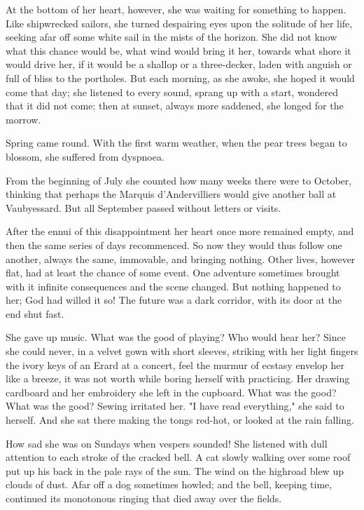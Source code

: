 \documentclass{tufte-book}
\begin{document}
At the bottom of her heart, however, she was waiting for something to
happen. Like shipwrecked sailors, she turned despairing eyes upon the
solitude of her life, seeking afar off some white sail in the mists of
the horizon. She did not know what this chance would be, what wind would
bring it her, towards what shore it would drive her, if it would be a
shallop or a three-decker, laden with anguish or full of bliss to the
portholes. But each morning, as she awoke, she hoped it would come that
day; she listened to every sound, sprang up with a start, wondered that
it did not come; then at sunset, always more saddened, she longed for
the morrow.

Spring came round. With the first warm weather, when the pear trees
began to blossom, she suffered from dyspnoea.

From the beginning of July she counted how many weeks there were to
October, thinking that perhaps the Marquis d'Andervilliers would give
another ball at Vaubyessard. But all September passed without letters or
visits.

After the ennui of this disappointment her heart once more remained
empty, and then the same series of days recommenced. So now they would
thus follow one another, always the same, immovable, and bringing
nothing. Other lives, however flat, had at least the chance of some
event. One adventure sometimes brought with it infinite consequences and
the scene changed. But nothing happened to her; God had willed it so!
The future was a dark corridor, with its door at the end shut fast.

She gave up music. What was the good of playing? Who would hear her?
Since she could never, in a velvet gown with short sleeves, striking
with her light fingers the ivory keys of an Erard at a concert, feel
the murmur of ecstasy envelop her like a breeze, it was not worth while
boring herself with practicing. Her drawing cardboard and her embroidery
she left in the cupboard. What was the good? What was the good? Sewing
irritated her. "I have read everything," she said to herself. And she
sat there making the tongs red-hot, or looked at the rain falling.

How sad she was on Sundays when vespers sounded! She listened with dull
attention to each stroke of the cracked bell. A cat slowly walking over
some roof put up his back in the pale rays of the sun. The wind on the
highroad blew up clouds of dust. Afar off a dog sometimes howled; and
the bell, keeping time, continued its monotonous ringing that died away
over the fields.
\end{document}
